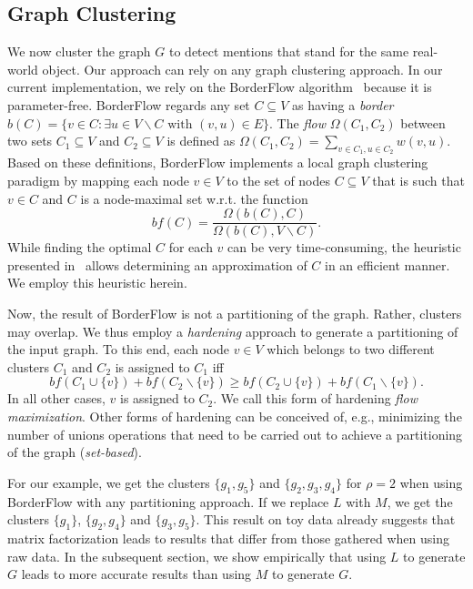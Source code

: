 \subsection{Graph Clustering}
We now cluster the graph $G$ to detect mentions that stand for the same real-world object.
Our approach can rely on any graph clustering approach.
In our current implementation, we rely on the BorderFlow algorithm~\cite{DBLP:conf/cicling/NgomoS09} because it is parameter-free.
BorderFlow regards any set $C \subseteq V$ as having a \emph{border} $b(C) = \{v \in C: \exists u \in V \backslash C \mbox{ with } (v, u) \in E\}$.
The \emph{flow} $\Omega(C_1, C_2)$ between two sets $C_1 \subseteq V$ and  $C_2 \subseteq V$ is defined as $\Omega(C_1, C_2) = \sum\limits_{v \in C_1, u \in C_2} w(v, u)$.
Based on these definitions, BorderFlow implements a local graph clustering paradigm by mapping each node $v \in V$ to the set of nodes $C \subseteq V$ that is such that $v \in C$ and $C$ is a node-maximal set w.r.t. the function 
\begin{equation}
bf(C) = \frac{\Omega(b(C), C)}{\Omega(b(C), V \backslash C)}.
\end{equation}
While finding the optimal $C$ for each $v$ can be very time-consuming, the heuristic presented in~\cite{DBLP:bibsonomy_NGO10b} allows determining an approximation of $C$ in an efficient manner.
We employ this heuristic herein.

Now, the result of BorderFlow is not a partitioning of the graph.
Rather, clusters may overlap.
We thus employ a \emph{hardening} approach to generate a partitioning of the input graph.
To this end, each node $v\in V$ which belongs to two different clusters $C_1$ and $C_2$ is assigned to $C_1$ iff
\begin{equation}
bf(C_1 \cup \{v\}) + bf(C_2 \backslash \{v\}) \geq bf(C_2 \cup \{v\}) + bf(C_1 \backslash \{v\}).
\end{equation}
In all other cases, $v$ is assigned to $C_2$.
We call this form of hardening \emph{flow maximization}.
Other forms of hardening can be conceived of, e.g., minimizing the number of unions operations that need to be carried out to achieve a partitioning of the graph (\emph{set-based}).

For our example, we get the clusters $\{g_1, g_5\}$ and $\{g_2, g_3, g_4\}$ for $\rho=2$ when using BorderFlow with any partitioning approach.
If we replace $L$ with $M$, we get the clusters  $\{g_1\}$, $\{g_2, g_4\}$ and $\{g_3, g_5\}$.
This result on toy data already suggests that matrix factorization leads to results that differ from those gathered when using raw data.
In the subsequent section, we show empirically that using $L$ to generate $G$ leads to more accurate results than using $M$ to generate $G$.

